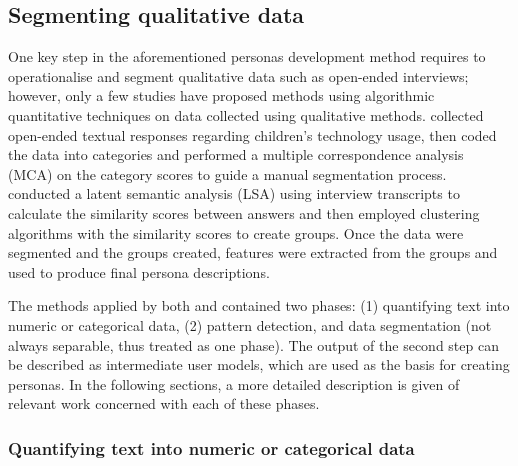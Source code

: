 \subsection{Segmenting qualitative data}

One key step in the aforementioned personas development method requires to operationalise and segment qualitative data such as open-ended interviews; however, only a few studies have proposed methods using algorithmic quantitative techniques on data collected using qualitative methods. \cite{Laporte2012} collected open-ended textual responses regarding children's technology usage, then coded the data into categories and performed a multiple correspondence analysis (MCA) on the category scores to guide a manual segmentation process. \cite{Miaskiewicz2008} conducted a latent semantic analysis (LSA) using interview transcripts to calculate the similarity scores between answers and then employed clustering algorithms with the similarity scores to create groups. Once the data were segmented and the groups created, features were extracted from the groups and used to produce final persona descriptions.

The methods applied by both \cite{Laporte2012} and \cite{Miaskiewicz2008} contained two phases: (1) quantifying text into numeric or categorical data, (2) pattern detection, and data segmentation (not always separable, thus treated as one phase).
The output of the second step can be described as intermediate user models, which are used as the basis for creating personas.
In the following sections, a more detailed description is given of relevant work concerned with each of these phases.

\subsubsection{Quantifying text into numeric or categorical data}


